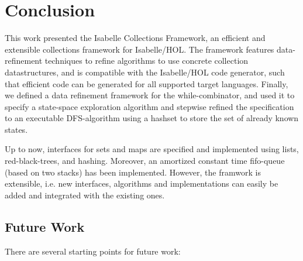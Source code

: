 \chapter{Conclusion}\label{ch:conclusion}

This work presented the Isabelle Collections Framework, an efficient and extensible collections framework for Isabelle/HOL.
The framework features data-refinement techniques to refine algorithms to use concrete collection datastructures,
and is compatible with the Isabelle/HOL code generator, such that efficient code can be generated for all supported target languages.
Finally, we defined a data refinement framework for the while-combinator, and used it to specify a state-space exploration algorithm
and stepwise refined the specification to an executable DFS-algorithm using a hashset to store the set of already known states.

Up to now, interfaces for sets and maps are specified and implemented using lists, red-black-trees, and hashing. Moreover, an amortized constant time 
fifo-queue (based on two stacks) has been implemented. However, the framwork is extensible, i.e. new interfaces, algorithms and implementations can easily be added and integrated with the existing ones.

\section{Future Work}
There are several starting points for future work:

